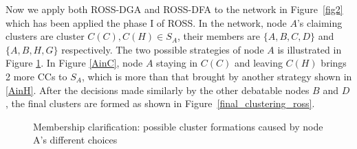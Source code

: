 \documentclass[times]{ettauth}
\theoremstyle{mytheoremstyle}
\theoremstyle{mytheoremstyle}
\theoremstyle{mytheoremstyle}
\begin{document}
Now we apply both ROSS-DGA and ROSS-DFA to the network in Figure~\ref{fig2} which has been applied the phase I of ROSS.
In the network, node $A$'s claiming clusters are cluster $C(C), C(H)\in S_A$, their members are $\{A,B,C,D\}$ and $\{A,B,H,G\}$ respectively. 
The two possible strategies of node $A$ is illustrated in Figure \ref{fig3}.
In Figure \ref{AinC}, node $A$ staying in $C(C)$ and leaving $C(H)$ brings 2 more CCs to $S_A$, which is more than that brought by another strategy shown in \ref{AinH}.
After the decisions made similarly by the other debatable nodes $B$ and $D$, the final clusters are formed as shown in Figure~\ref{final_clustering_ross}.



\begin{figure}[h]
\centering
{}
\hspace{.15 in}
\caption[]{Membership clarification: possible cluster formations caused by node A's different choices} %
\label{fig3}
\end{figure}
\end{document}
